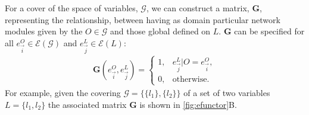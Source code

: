 For a cover of the space of variables, $\mathcal{G}$, we can construct a matrix, $\mathbf{G}$, representing the relationship,
between \gnpm{} having as domain particular network modules given by the $O \in \mathcal{G}$ and those global \gnpm{} defined on $L$.
$\mathbf{G}$ can be specified for all $e^O_{\vec{i}} \in \mathcal{E}(\mathcal{G})$ and $e^{L}_{\vec{j}} \in \mathcal{E}(L)$:
\begin{eqnarray}\label{eq:margmat}
\mathbf{G}(e^O_{\vec{i}},e^L_{\vec{j}}) =
\begin{cases}
1, & e^L_{\vec{j}}|O = e^O_{\vec{i}},\\
0, & \text{otherwise}.
\end{cases}
\end{eqnarray}
For example, given the covering $\mathcal{G} = \{ \{l_1\}, \{l_2\} \}$ of a set of two variables $L = \{ l_1, l_2 \}$ the associated matrix $\mathbf{G}$ is shown in \autoref{fig:efunctor}B.


